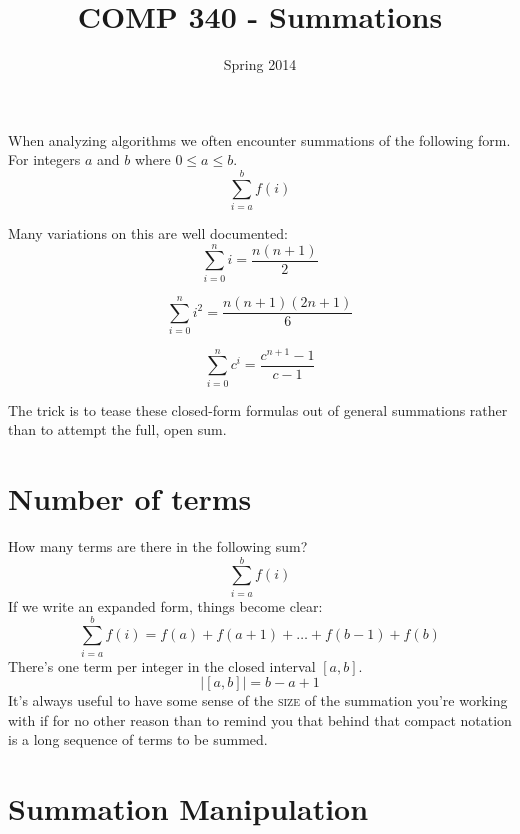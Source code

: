 \documentclass[]{tufte-handout}
\title{COMP 340 - Summations}
\date{Spring 2014}
\begin{document}
\maketitle

When analyzing algorithms we often encounter summations of the following form. For integers $a$ and $b$ where $0 \leq a \leq b$.
\begin{equation}
\sum\limits_{i=a}^{b}f(i)
\end{equation}

Many variations on this are well documented:
\begin{equation}
\sum\limits_{i=0}^{n}i = \dfrac{n(n+1)}{2}
\end{equation}

\begin{equation}
\sum\limits_{i=0}^{n}i^2 = \dfrac{n(n+1)(2n+1)}{6}
\end{equation}

\begin{equation}
\sum\limits_{i=0}^{n}c^i = \dfrac{c^{n+1}-1}{c-1}
\end{equation}

The trick is to tease these closed-form formulas out of general summations rather than to attempt the full, open sum.

\section{Number of terms}

How many terms are there in the following sum?
\begin{equation*}
\sum\limits_{i=a}^{b}f(i)
\end{equation*}
If we write an expanded form, things become clear:
\begin{equation*}
\sum\limits_{i=a}^{b}f(i) = f(a) + f(a+1) + \ldots + f(b-1) + f(b)
\end{equation*}
There's one term per integer in the closed interval $[a,b]$.  
\begin{equation}
| [a,b] | = b-a+1
\end{equation}
It's always useful to have some sense of the \textsc{size} of the summation you're working with if for no other reason than to remind you that behind that compact notation is a long sequence of terms to be summed. 


\section{Summation Manipulation}
\end{document}
